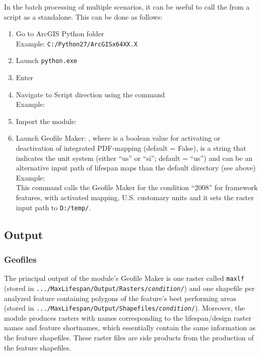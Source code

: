 In the batch processing of multiple scenarios, it can be useful to call the  from a script as a standalone. This can be done as follows:

\begin{enumerate}
	\item Go to ArcGIS Python folder\\
	Example: \texttt{C:/Python27/ArcGISx64XX.X}
	\item Launch \texttt{python.exe}
	\item Enter 
	\item Navigate to Script direction using the command \\
	Example: 
	\item Import the module: \\
	\item Launch Geofile Maker: , where  is a boolean value for activating or deactivation of integrated PDF-mapping (default = False),  is a string that indicates the unit system (either ``us'' or ``si''; default = ``us'') and  can be an alternative input path of lifespan maps than the default directory (see above)\\
	Example: \\
	This command calls the Geofile Maker for the condition ``2008'' for framework features, with activated mapping, U.S. customary units and it sets the raster input path to \texttt{D:/temp/}.
\end{enumerate}



\subsection{Output}
\label{sec:actoutput}
\subsubsection{Geofiles}
The principal output of the module's Geofile Maker is one raster called \texttt{max{\myUnderscore}lf} (stored in \texttt{.../MaxLifespan/Output/Rasters/\textit{condition}/}) and one shapefile per analyzed feature containing polygons of the feature's best performing areas (stored in \texttt{.../MaxLifespan/Output/Shapefiles/\textit{condition}/}). Moreover, the module produces rasters with names corresponding to the lifespan/design raster names and feature shortnames, which essentially contain the same information as the feature shapefiles. These raster files are side products from the production of the feature shapefiles.

